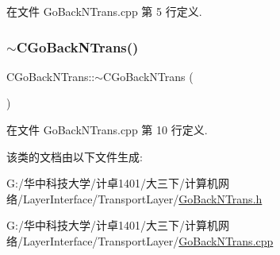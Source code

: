在文件 Go\+Back\+N\+Trans.\+cpp 第 5 行定义.

\mbox{\label{class_c_go_back_n_trans_aacaab4e6b5a5d2bae788a10f3c78d417}} 
\subsubsection{\texorpdfstring{$\sim$\+C\+Go\+Back\+N\+Trans()}{~CGoBackNTrans()}}
{\footnotesize\ttfamily C\+Go\+Back\+N\+Trans\+::$\sim$\+C\+Go\+Back\+N\+Trans (\begin{DoxyParamCaption}{ }\end{DoxyParamCaption})}



在文件 Go\+Back\+N\+Trans.\+cpp 第 10 行定义.



该类的文档由以下文件生成\+:\begin{DoxyCompactItemize}
\item 
G\+:/华中科技大学/计卓1401/大三下/计算机网络/\+Layer\+Interface/\+Transport\+Layer/\hyperlink{_go_back_n_trans_8h}{Go\+Back\+N\+Trans.\+h}\item 
G\+:/华中科技大学/计卓1401/大三下/计算机网络/\+Layer\+Interface/\+Transport\+Layer/\hyperlink{_go_back_n_trans_8cpp}{Go\+Back\+N\+Trans.\+cpp}\end{DoxyCompactItemize}
